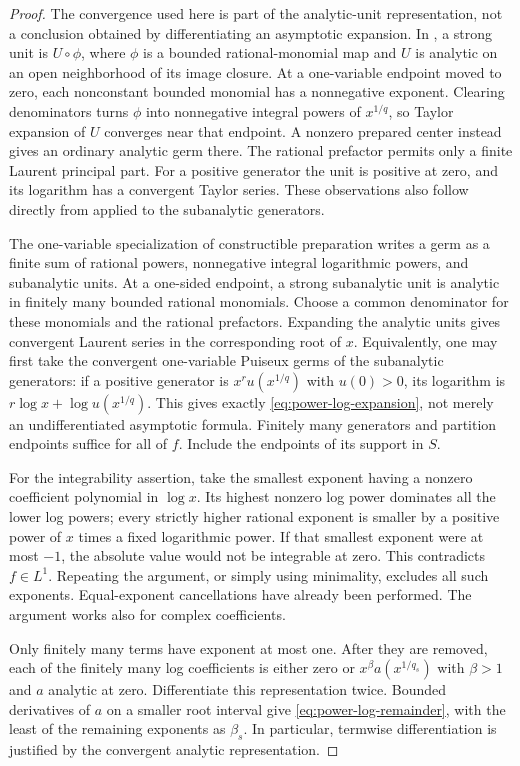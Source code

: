 \begin{proof}
The convergence used here is part of the analytic-unit representation,
not a conclusion obtained by differentiating an asymptotic expansion.
In \cite[Definitions 2.2--2.3]{CMInt}, a strong unit is $U\circ\phi$,
where $\phi$ is a bounded rational-monomial map and $U$ is analytic
on an open neighborhood of its image closure. At a one-variable
endpoint moved to zero, each nonconstant bounded monomial has a
nonnegative exponent. Clearing denominators turns $\phi$ into
nonnegative integral powers of $x^{1/q}$, so Taylor expansion of $U$
converges near that endpoint. A nonzero prepared center instead gives
an ordinary analytic germ there. The rational prefactor permits only
a finite Laurent principal part. For a positive generator the unit
is positive at zero, and its logarithm has a convergent Taylor series.
These observations also follow directly from
\cite[Theorem 2.4]{CMInt} applied to the subanalytic generators.

The one-variable specialization of constructible preparation
\cite[Theorem 3.11]{CMInt} writes a germ as a finite sum of rational
powers, nonnegative integral logarithmic powers, and subanalytic units.
At a one-sided endpoint, a strong subanalytic unit is analytic in
finitely many bounded rational monomials. Choose a common denominator
for these monomials and the rational prefactors. Expanding the analytic
units gives convergent Laurent series in the corresponding root of $x$.
Equivalently, one may first take the convergent one-variable Puiseux
germs of the subanalytic generators: if a positive generator is
$x^r u(x^{1/q})$ with $u(0)>0$, its logarithm is
$r\log x+\log u(x^{1/q})$. This gives exactly
\eqref{eq:power-log-expansion}, not merely an undifferentiated asymptotic
formula. Finitely many generators and partition endpoints suffice for
all of $f$. Include the endpoints of its support in $S$.

For the integrability assertion, take the smallest exponent having a
nonzero coefficient polynomial in $\log x$. Its highest nonzero log
power dominates all the lower log powers; every strictly higher
rational exponent is smaller by a positive power of $x$ times a fixed
logarithmic power. If that smallest exponent were at most $-1$, the
absolute value would not be integrable at zero. This contradicts
$f\in L^1$. Repeating the argument, or simply using minimality, excludes
all such exponents. Equal-exponent cancellations have already been
performed. The argument works also for complex coefficients.

Only finitely many terms have exponent at most one. After they are
removed, each of the finitely many log coefficients is either zero or
$x^{\beta}a(x^{1/q_s})$ with $\beta>1$ and $a$ analytic at zero.
Differentiate this representation twice. Bounded derivatives of $a$ on
a smaller root interval give \eqref{eq:power-log-remainder}, with the
least of the remaining exponents as $\beta_s$. In particular, termwise
differentiation is justified by the convergent analytic representation.
\end{proof}

